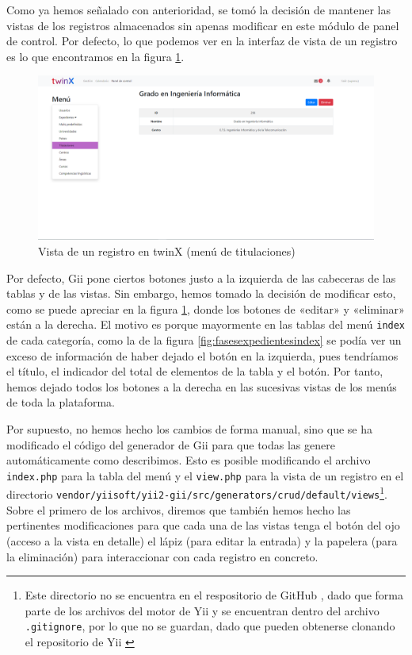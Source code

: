 Como ya hemos señalado con anterioridad, se tomó la decisión de mantener las vistas de los registros almacenados sin apenas modificar en este módulo de panel de control. Por defecto, lo que podemos ver en la interfaz de vista de un registro es lo que encontramos en la figura \ref{fig:vistatitulaciontwinX}.

\begin{figure}
	\centering
	\includegraphics[width=\textwidth]{img/Capturas de twinX/vista_titulacion}
	\caption[Vista de un registro en twinX]{Vista de un registro en twinX (menú de titulaciones)}
	\label{fig:vistatitulaciontwinX}
\end{figure}

Por defecto, Gii pone ciertos botones justo a la izquierda de las cabeceras de las tablas y de las vistas. Sin embargo, hemos tomado la decisión de modificar esto, como se puede apreciar en la figura \ref{fig:vistatitulaciontwinX}, donde los botones de «editar» y «eliminar» están a la derecha. El motivo es porque mayormente en las tablas del menú \texttt{index} de cada categoría, como la de la figura \ref{fig:fasesexpedientesindex} se podía ver un exceso de información de haber dejado el botón en la izquierda, pues tendríamos el título, el indicador del total de elementos de la tabla y el botón. Por tanto, hemos dejado todos los botones a la derecha en las sucesivas vistas de los menús de toda la plataforma.

Por supuesto, no hemos hecho los cambios de forma manual, sino que se ha modificado el código del generador de Gii para que todas las genere automáticamente como describimos. Esto es posible modificando el archivo \texttt{index.php} para la tabla del menú y el \texttt{view.php} para la vista de un registro en el directorio \texttt{vendor/yiisoft/yii2-gii/src/generators/crud/default/views}\footnote{Este directorio no se encuentra en el respositorio de GitHub \cite{repogit}, dado que forma parte de los archivos del motor de Yii y se encuentran dentro del archivo \texttt{.gitignore}, por lo que no se guardan, dado que pueden obtenerse clonando el repositorio de Yii \cite{yii2advanced}}. Sobre el primero de los archivos, diremos que también hemos hecho las pertinentes modificaciones para que cada una de las vistas tenga el botón del ojo (acceso a la vista en detalle) el lápiz (para editar la entrada) y la papelera (para la eliminación) para interaccionar con cada registro en concreto.


